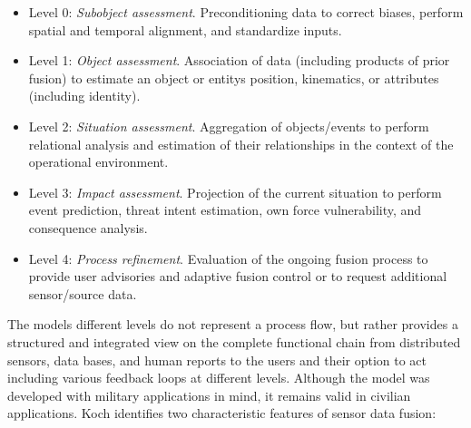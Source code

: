\begin{itemize}
    \item Level 0: \textit{Subobject assessment}. Preconditioning data to correct biases, perform spatial and temporal alignment, and standardize inputs.
    \item Level 1: \textit{Object assessment}. Association of data (including products of prior fusion) to estimate an object or entitys position, kinematics, or attributes (including identity).
    \item Level 2: \textit{Situation assessment}. Aggregation of objects/events to perform relational analysis and estimation of their relationships in the context of the operational environment.
    \item Level 3: \textit{Impact assessment}. Projection of the current situation to perform event prediction, threat intent estimation, own force vulnerability, and consequence analysis.
    \item Level 4: \textit{Process refinement}. Evaluation of the ongoing fusion process to provide user advisories and adaptive fusion control or to request additional sensor/source data.
\end{itemize}
The models different levels do not represent a process flow, but rather provides a structured and integrated view on the complete functional chain from distributed sensors, data bases, and human reports to the users and their option to act including various feedback loops at different levels. Although the model was developed with military applications in mind, it remains valid in civilian applications. Koch \cite{sensorFusion1} identifies two characteristic features of sensor data fusion:
